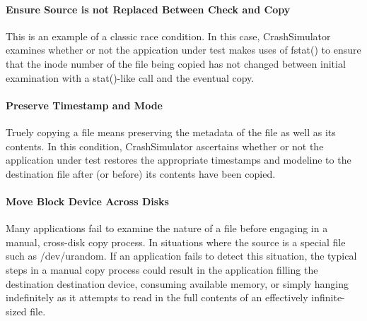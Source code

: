         \paragraph{Ensure Source is not Replaced Between Check and Copy}

        This is an example of a classic race condition.  In this case, CrashSimulator examines whether or not the
        appication under test makes uses of fstat() to ensure that the inode number of the file being copied has not
        changed between initial examination with a stat()-like call and the eventual copy.  

        \paragraph{Preserve Timestamp and Mode}

        Truely copying a file means preserving the metadata of the file as well as its contents.  In this condition,
        CrashSimulator ascertains whether or not the application under test restores the appropriate timestamps and
        modeline to the destination file after (or before) its contents have been copied. 

        \paragraph{Move Block Device Across Disks}

        Many applications fail to examine the nature of a file before engaging in a manual, cross-disk copy process.  In
        situations where the source is a special file such as /dev/urandom.  If an application fails to detect this
        situation, the typical steps in a manual copy process could result in the application filling the destination
        destination device, consuming available memory, or simply hanging indefinitely as it attempts to read in the
        full contents of an effectively infinite-sized file.


